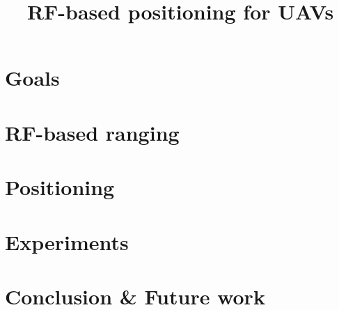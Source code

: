 \documentclass[12pt,oneside,a4paper,english]{article}
\title{RF-based positioning for UAVs} %
\begin{document}


\newpage
\doublespacing
\renewcommand{\baselinestretch}{1}\normalsize
\tableofcontents
\renewcommand{\baselinestretch}{1}\normalsize
\thispagestyle{fancy} %

\newpage
{}

\section{Goals} \label{ch1}


\newpage

\section{RF-based ranging} \label{ch2}


\newpage

\section{Positioning} \label{ch3}


\newpage

\section{Experiments} \label{ch4}


\newpage

\section{Conclusion \& Future work} \label{ch5}


\label{EndOfText}

\newpage
{}



\label{endOfDoc}
\end{document}
